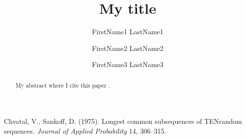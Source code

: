 



\title{My title} %



\author[1]{\small FirstName1 LastName1}     %

\author[1, 2]{\small FirstName2 LastName2}
\author[2]{\small FirstName3 LastName3}




\maketitle


\begin{abstract}
My abstract where I cite this paper  \cite{paper1}.
\end{abstract}



\begin{thebibliography}{1}
Chvatal, V., Sankoff, D. (1975). Longest common subsequences of TENrandom
  sequences. \textit{Journal of Applied Probability} 14, 306--315.
\end{thebibliography}
